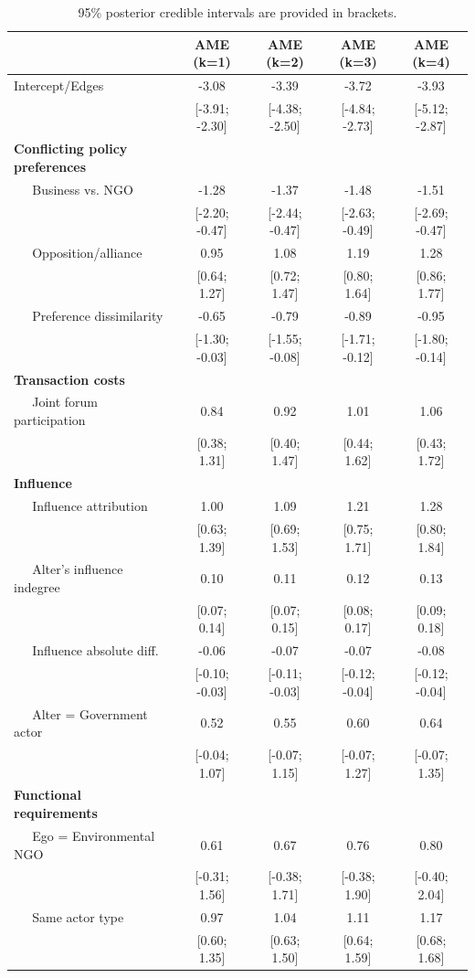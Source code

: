 \documentclass[12pt,pdflatex]{elsarticle}
\begin{document}
\begin{table}[ht]
\centering
\begingroup\footnotesize
\begin{tabular}{lcccc}
   & AME (k=1) & AME (k=2) & AME (k=3) & AME (k=4) \\
  \hline
\hline
Intercept/Edges & -3.08 & -3.39 & -3.72 & -3.93 \\
   & [-3.91; -2.30] & [-4.38; -2.50] & [-4.84; -2.73] & [-5.12; -2.87] \\
  \textbf{Conflicting policy preferences} &  &  &  &  \\
  $\;\;\;\;$ Business vs. NGO & -1.28 & -1.37 & -1.48 & -1.51 \\
   & [-2.20; -0.47] & [-2.44; -0.47] & [-2.63; -0.49] & [-2.69; -0.47] \\
  $\;\;\;\;$ Opposition/alliance & 0.95 & 1.08 & 1.19 & 1.28 \\
   & [0.64; 1.27] & [0.72; 1.47] & [0.80; 1.64] & [0.86; 1.77] \\
  $\;\;\;\;$ Preference dissimilarity & -0.65 & -0.79 & -0.89 & -0.95 \\
   & [-1.30; -0.03] & [-1.55; -0.08] & [-1.71; -0.12] & [-1.80; -0.14] \\
  \textbf{Transaction costs} &  &  &  &  \\
  $\;\;\;\;$ Joint forum participation & 0.84 & 0.92 & 1.01 & 1.06 \\
   & [0.38; 1.31] & [0.40; 1.47] & [0.44; 1.62] & [0.43; 1.72] \\
  \textbf{Influence} &  &  &  &  \\
  $\;\;\;\;$ Influence attribution & 1.00 & 1.09 & 1.21 & 1.28 \\
   & [0.63; 1.39] & [0.69; 1.53] & [0.75; 1.71] & [0.80; 1.84] \\
  $\;\;\;\;$ Alter's influence indegree & 0.10 & 0.11 & 0.12 & 0.13 \\
   & [0.07; 0.14] & [0.07; 0.15] & [0.08; 0.17] & [0.09; 0.18] \\
  $\;\;\;\;$ Influence absolute diff. & -0.06 & -0.07 & -0.07 & -0.08 \\
   & [-0.10; -0.03] & [-0.11; -0.03] & [-0.12; -0.04] & [-0.12; -0.04] \\
  $\;\;\;\;$ Alter = Government actor & 0.52 & 0.55 & 0.60 & 0.64 \\
   & [-0.04; 1.07] & [-0.07; 1.15] & [-0.07; 1.27] & [-0.07; 1.35] \\
  \textbf{Functional requirements} &  &  &  &  \\
  $\;\;\;\;$ Ego = Environmental NGO & 0.61 & 0.67 & 0.76 & 0.80 \\
   & [-0.31; 1.56] & [-0.38; 1.71] & [-0.38; 1.90] & [-0.40; 2.04] \\
  $\;\;\;\;$ Same actor type & 0.97 & 1.04 & 1.11 & 1.17 \\
   & [0.60; 1.35] & [0.63; 1.50] & [0.64; 1.59] & [0.68; 1.68] \\
   \hline
\hline
\end{tabular}
\endgroup
\caption{95\% posterior credible intervals are provided in brackets.}
\label{tab:regTable_ame}
\end{table}
\end{document}
